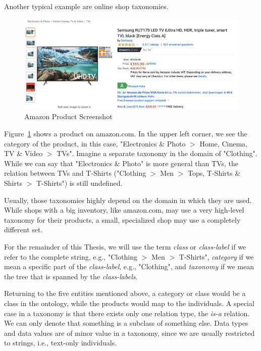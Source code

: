 Another typical example are online shop taxonomies.
\begin{figure}[!htbp]
    \centering
    \includegraphics[width=13cm]{images/taxonomy_amazon.png}
    \caption[Amazon Product Screenshot]{Amazon Product Screenshot\protect\footnotemark}
    \label{fig:amazon_product}
\end{figure}
Figure~\ref{fig:amazon_product} shows a product on amazon.com.
In the upper left corner, we see the category of the product, in this case,
"Electronics \& Photo $>$ Home, Cinema, TV \& Video $>$ TVs".
Imagine a separate taxonomy in the domain of "Clothing".
While we can say that "Electronics \& Photo" is more general than TVs, the relation
between TVs and T-Shirts ("Clothing $>$ Men $>$ Tops, T-Shirts \& Shirts $>$ T-Shirts") is still undefined.

Usually, those taxonomies highly depend on the domain in which they are used.
While shops with a big inventory, like amazon.com, may use a very high-level taxonomy for their products,
a small, specialized shop may use a completely different set.

For the remainder of this Thesis, we will use the term \emph{class} or \emph{class-label} if we refer to the complete
string, e.g., "Clothing $>$ Men $>$ T-Shirts", \emph{category} if we mean a specific part of the \emph{class-label},
e.g., "Clothing", and \emph{taxonomy} if we mean the tree that is spanned by the \emph{class-labels}.

Returning to the five entities mentioned above, a category or class would be a class in the ontology,
while the products would map to the individuals.
A special case in a taxonomy is that there exists only one relation type, the \emph{is-a} relation.
We can only denote that something is a subclass of something else.
Data types and data values are of minor value in a taxonomy, since we are usually restricted to strings,
i.e., text-only individuals.

